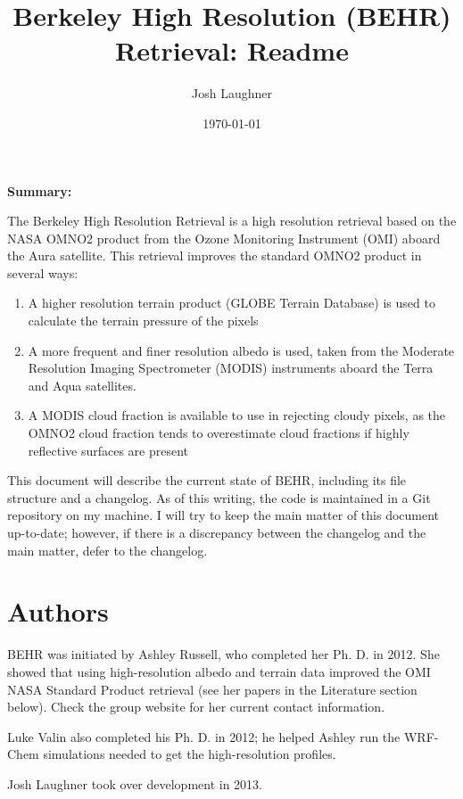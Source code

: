 \documentclass[12pt]{article}
\title{\textbf{Be}rkeley \textbf{H}igh \textbf{R}esolution (\textbf{BEHR}) Retrieval: Readme}
\author{Josh Laughner}
\date{\today}
\begin{document}
\maketitle
\setlength{\emergencystretch}{3em}

\noindent\textbf{Summary:}

	The Berkeley High Resolution Retrieval is a high resolution  retrieval based on the NASA OMNO2 product from the Ozone Monitoring Instrument (OMI) aboard the Aura satellite.  This  retrieval improves the standard OMNO2 product in several ways: 
	\begin{enumerate}
 	 \item A higher resolution terrain product (GLOBE Terrain Database) is used to calculate the terrain pressure of the pixels
	 \item A more frequent and finer resolution albedo is used, taken from the Moderate Resolution Imaging Spectrometer (MODIS) instruments aboard the Terra and Aqua satellites.
	 \item A MODIS cloud fraction is available to use in rejecting cloudy pixels, as the OMNO2 cloud fraction tends to overestimate cloud fractions if highly reflective surfaces are present
	\end{enumerate}
	
	This document will describe the current state of BEHR, including its file structure and a changelog.  As of this writing, the code is maintained in a Git repository on my machine.  I will try to keep the main matter of this document up-to-date; however, if there is a discrepancy between the changelog and the main matter, defer to the changelog.
	
\tableofcontents

\section{Authors}

	BEHR was initiated by Ashley Russell, who completed her Ph. D. in 2012.  She showed that using high-resolution albedo and terrain data improved the OMI NASA Standard Product retrieval (see her papers in the Literature section below).  Check the group website for her current contact information.
	
	Luke Valin also completed his Ph. D. in 2012; he helped Ashley run the WRF-Chem simulations needed to get the high-resolution  profiles.
	
	Josh Laughner took over development in 2013.
	
\end{document}
